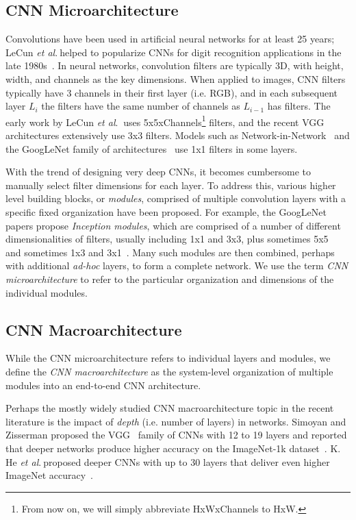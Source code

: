 \documentclass{article} \usepackage{iclr2017_conference,times}
\newcommand{\etal}{\textit{et al}.$~$}
\renewcommand{\cite}{\citep}
\def\vsp{\vspace{-0.15in}}
\begin{document}
\subsection{CNN Microarchitecture}
\vsp

Convolutions have been used in artificial neural networks for at least 25 years; LeCun \etal helped to popularize CNNs for digit recognition applications in the late 1980s~\cite{LeCun89}.
In neural networks, convolution filters are typically 3D, with height, width, and channels as the key dimensions.
When applied to images, CNN filters typically have 3 channels in their first layer (i.e. RGB), and in each subsequent layer $L_i$ the filters have the same number of channels as $L_{i-1}$ has filters.
The early work by LeCun \etal\cite{LeCun89} uses 5x5xChannels\footnote{From now on, we will simply abbreviate HxWxChannels to HxW.} filters, and the recent VGG~\cite{VGG-19} architectures extensively use 3x3 filters.
Models such as Network-in-Network~\cite{NiN} and the GoogLeNet family of architectures~\cite{googlenet,googleBN,googlenet-v3,googlenet-v4} use 1x1 filters in some layers.

With the trend of designing very deep CNNs, it becomes cumbersome to manually select filter dimensions for each layer.
To address this, various higher level building blocks, or {\em modules}, comprised of multiple convolution layers with a specific fixed organization have been proposed.
For example, the GoogLeNet papers propose {\em Inception modules}, which are comprised of a number of different dimensionalities of filters, usually including 1x1 and 3x3, plus sometimes 5x5~\cite{googlenet} and sometimes 1x3 and 3x1~\cite{googlenet-v3}.
Many such modules are then combined, perhaps with additional {\em ad-hoc} layers, to form a complete network. 
We use the term {\em CNN microarchitecture} to refer to the particular organization and dimensions of the individual modules. 



\subsection{CNN Macroarchitecture}
\vsp

While the CNN microarchitecture refers to individual layers and modules, we define the {\em CNN macroarchitecture} as the system-level organization of multiple modules into an end-to-end CNN architecture.

Perhaps the mostly widely studied CNN macroarchitecture topic in the recent literature is the impact of {\em depth} (i.e. number of layers) in networks.
Simoyan and Zisserman proposed the VGG~\cite{VGG-19} family of CNNs with 12 to 19 layers and reported that deeper networks produce higher accuracy on the ImageNet-1k dataset~\cite{imagenet}.
K. He \etal proposed deeper CNNs with up to 30 layers that deliver even higher ImageNet accuracy~\cite{He2015}.
\end{document}
